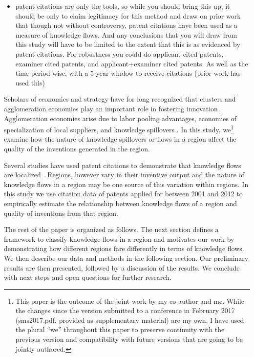 \documentclass[12pt,letterpaper]{article}
\begin{document}
\begin{itemize}
\item patent citations are only the tools, so while you should bring this up, it should be only to claim legitimacy for this method and draw on prior work that though not without controversy, patent citations have been used as a measure of knowledge flows. And any conclusions that you will draw from this study will have to be limited to the extent that this is as evidenced by patent citations. For robustness you could do  applicant cited patents, examiner cited patents, and applicant+examiner cited patents. As well as the time period wise, with a 5 year window to receive citations (prior work has used this)
\end{itemize}

Scholars of economics and strategy have for long recognized that clusters and agglomeration economies play an important role in fostering innovation \citep{Marshall1890, Porter1990}. Agglomeration economies arise due to labor pooling advantages, economies of specialization of local suppliers, and knowledge spillovers \citep{Porter1990, Krugman1991a}. In this study, we\footnote{This paper is the outcome of the joint work by my co-author and me. While the changes since the version submitted to a conference in February 2017 (sms2017.pdf, provided as supplementary material) are my own, I have used the plural ``we'' throughout this paper to preserve continuity with the previous version and compatibility with future versions that are going to be jointly authored.} examine how the nature of knowledge spillovers or flows in a region affect the quality of the inventions generated in the region.\par
Several studies have used patent citations to demonstrate that knowledge flows are localized \citep*{Jaffe1993, Almeida1999, Alcacer2006a}. Regions, however vary in their inventive output \citep*{Agrawal2014b} and the nature of knowledge flows in a region may be one source of this variation within regions. In this study we use citation data of patents applied for between 2001 and 2012 to empirically estimate the relationship between knowledge flows of a region and quality of inventions from that region. \par
The rest of the paper is organized as follows. The next section defines a framework to classify knowledge flows in a region and motivates our work by demonstrating how different regions fare differently in terms of knowledge flows. We then describe our data and methods in the following section. Our preliminary results are then presented, followed by a discussion of the results. We conclude with next steps and open questions for further research.
\end{document}
